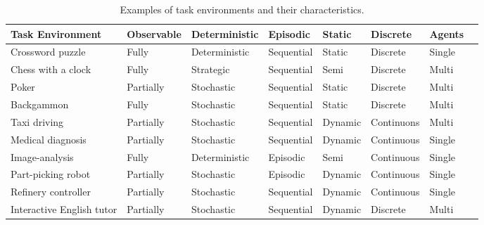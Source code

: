 \documentclass[11pt,oneside,a4paper,openright]{report}
\begin{document}
	\begin{table}[h]
	\centering
	\begin{tabular}{||l|l|l|l|l|l|l|l||}
		\hline
		\hline
		\textbf{Task} \textbf{Environment} & \textbf{Observable} & \textbf{Deterministic} & \textbf{Episodic} & \textbf{Static} & \textbf{Discrete} & \textbf{Agents}\\
		\hline
		Crossword puzzle 	& Fully & Deterministic & Sequential & Static & Discrete & Single	\\ \hline
		Chess with a clock	& Fully & Strategic     & Sequential & Semi   & Discrete & Multi	\\ \hline
		Poker			& Partially & Stochastic & Sequential & Static & Discrete & Multi	\\ \hline
		Backgammon		& Fully & Stochastic    & Sequential & Static & Discrete & Multi	\\ \hline
		Taxi driving		& Partially & Stochastic & Sequential & Dynamic & Continuons & Multi	\\ \hline
		Medical diagnosis	& Partially & Stochastic & Sequential & Dynamic & Continuous & Single	\\ \hline
		Image-analysis		& Fully	& Deterministic & Episodic & Semi & Continuous & Single 	\\ \hline
		Part-picking robot	& Partially & Stochastic & Episodic & Dynamic & Continuous & Single	\\ \hline
		Refinery controller	& Partially & Stochastic & Sequential & Dynamic & Continuous & Single	\\ \hline
		Interactive English tutor & Partially & Stochastic & Sequential & Dynamic & Discrete & Multi	\\ \hline
		\hline
	\end{tabular}
	\caption{Examples of task environments and their characteristics.}
	\label{tab:EvironmentCharactExamples}
	\end{table}



\end{document}
